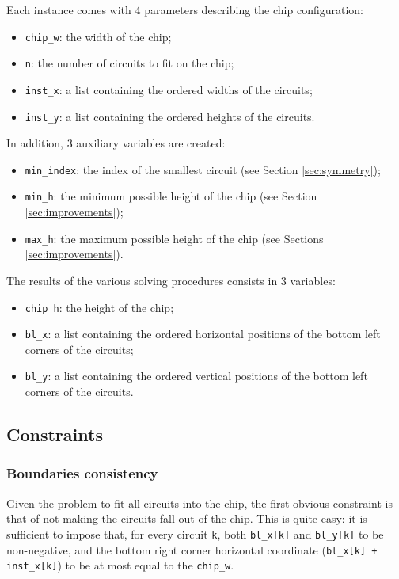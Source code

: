 \documentclass[a4paper, 12pt]{article}
\begin{document}
Each instance comes with 4 parameters describing the chip configuration:
\begin{itemize}
	\item \verb+chip_w+: the width of the chip;
	\item \verb+n+: the number of circuits to fit on the chip;
	\item \verb+inst_x+: a list containing the ordered widths of the circuits;
	\item \verb+inst_y+: a list containing the ordered heights of the circuits.
\end{itemize}
In addition, 3 auxiliary variables are created:
\begin{itemize}
	\item \verb+min_index+: the index of the smallest circuit (see Section \ref{sec:symmetry});
	\item \verb+min_h+: the minimum possible height of the chip (see Section \ref{sec:improvements});
	\item \verb+max_h+: the maximum possible height of the chip (see Sections \ref{sec:improvements}).
\end{itemize}
The results of the various solving procedures consists in 3 variables:
\begin{itemize}
	\item \verb+chip_h+: the height of the chip;
	\item \verb+bl_x+: a list containing the ordered horizontal positions of the bottom left corners of the circuits;
	\item \verb+bl_y+: a list containing the ordered vertical positions of the bottom left corners of the circuits.
\end{itemize}


\subsection{Constraints}

\subsubsection{Boundaries consistency}
Given the problem to fit all circuits into the chip, the first obvious constraint is that of not making the circuits fall out of the chip. This is quite easy: it is sufficient to impose that, for every circuit \verb|k|, both \verb|bl_x[k]| and \verb|bl_y[k]| to be non-negative, and the bottom right corner horizontal coordinate (\verb|bl_x[k] + inst_x[k]|) to be at most equal to the \verb|chip_w|.
\end{document}
